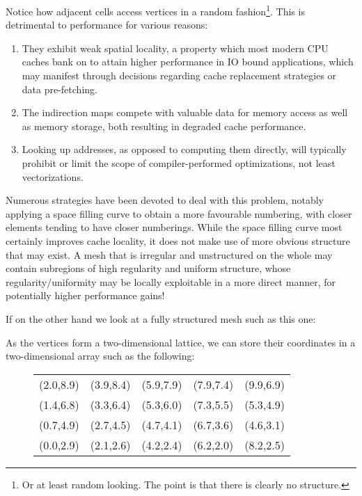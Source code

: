 Notice how adjacent cells access vertices in a random fashion\footnote{Or at least random looking. The point is that there is clearly no structure.}. This is detrimental to performance for various reasons:

\begin{enumerate}
\item They exhibit weak spatial locality, a property which most modern CPU caches bank on to attain higher performance in IO bound applications, which may manifest through decisions regarding cache replacement strategies or data pre-fetching.
\item The indirection maps compete with valuable data for memory access as well as memory storage, both resulting in degraded cache performance.
\item Looking up addresses, as opposed to computing them directly, will typically prohibit or limit the scope of compiler-performed optimizations, not least vectorizations.
\end{enumerate}

Numerous strategies have been devoted to deal with this problem, notably applying a space filling curve to obtain a more favourable numbering, with closer elements tending to have closer numberings. While the space filling curve most certainly improves cache locality, it does not make use of more obvious structure that may exist. A mesh that is irregular and unstructured on the whole may contain subregions of high regularity and uniform structure, whose regularity/uniformity may be locally exploitable in a more direct manner, for potentially higher performance gains!


If on the other hand we look at a fully structured mesh such as this one:

\begin{figure}[H]
\centering

\end{figure}

As the vertices form a two-dimensional lattice, we can store their coordinates in a two-dimensional array such as the following:
\begin{figure}[H]
\centering
\begin{tabular}{|c|c|c|c|c|}
(2.0,8.9) & (3.9,8.4) & (5.9,7.9) & (7.9,7.4) & (9.9,6.9) \\
(1.4,6.8) & (3.3,6.4) & (5.3,6.0) & (7.3,5.5) & (5.3,4.9) \\
(0.7,4.9) & (2.7,4.5) & (4.7,4.1) & (6.7,3.6) & (4.6,3.1) \\
(0.0,2.9) & (2.1,2.6) & (4.2,2.4) & (6.2,2.0) & (8.2,2.5) \\
\end{tabular}
\end{figure}

